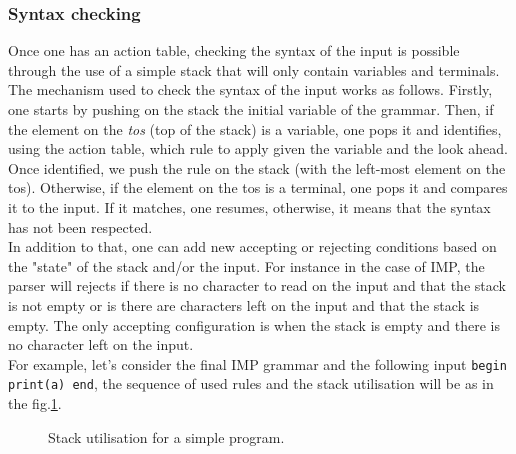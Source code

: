 \documentclass[a4paper,11pt]{article}
\begin{document}
    \subsubsection{Syntax checking}
      Once one has an action table, checking the syntax of the input is possible through the use of a simple stack that will only contain variables and terminals. The mechanism used to check the syntax of the input works as follows. Firstly, one starts by pushing on the stack the initial variable of the grammar. Then, if the element on the \textit{tos} (top of the stack) is a variable, one pops it and identifies, using the action table, which rule to apply given the variable and the look ahead. Once identified, we push the rule on the stack (with the left-most element on the tos). Otherwise, if the element on the tos is a terminal, one pops it and compares it to the input. If it matches, one resumes, otherwise, it means that the syntax has not been respected.\\
      In addition to that, one can add new accepting or rejecting conditions based on the "state" of the stack and/or the input. For instance in the case of IMP, the parser will rejects if there is no character to read on the input and that the stack is not empty or is there are characters left on the input and that the stack is empty. The only accepting configuration is when the stack is empty and there is no character left on the input.\\
      For example, let's consider the final IMP grammar and the following input \verb|begin print(a) end|, the sequence of used rules and the stack utilisation will be as in the fig.\ref{fig:simpleprogram}.
      \begin{figure}[h!]
        
        \caption{Stack utilisation for a simple program.}
        \label{fig:simpleprogram}
      \end{figure}
      
\end{document}
